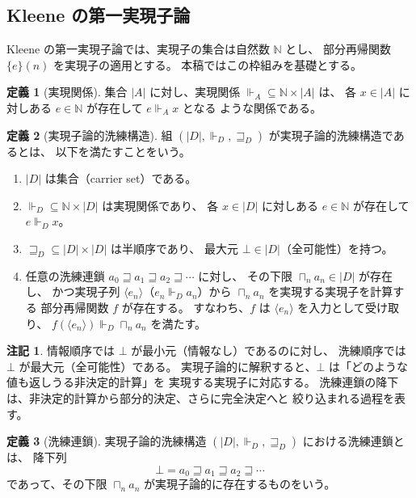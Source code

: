 \documentclass[11pt,a4paper]{article}
\theoremstyle{definition}
\newtheorem{definition}{定義}[section]
\newtheorem{remark}{注記}[section]
\DeclareMathOperator*{\bigsqcap}{\sqcap}
\newcommand{\Real}{\Vdash}
\begin{document}
\subsection{Kleene の第一実現子論}

Kleene の第一実現子論では、実現子の集合は自然数 $\mathbb{N}$ とし、
部分再帰関数 $\{e\}(n)$ を実現子の適用とする。
本稿ではこの枠組みを基礎とする。

\begin{definition}[実現関係]
集合 $|A|$ に対し、実現関係 $\Real_A \subseteq \mathbb{N} \times |A|$ は、
各 $x \in |A|$ に対しある $e \in \mathbb{N}$ が存在して $e \Real_A x$ となる
ような関係である。
\end{definition}

\begin{definition}[実現子論的洗練構造]
組 $(|D|, \Real_D, \sqsupseteq_D)$ が実現子論的洗練構造であるとは、
以下を満たすことをいう。

\begin{enumerate}
\item $|D|$ は集合（carrier set）である。
\item $\Real_D \subseteq \mathbb{N} \times |D|$ は実現関係であり、
  各 $x \in |D|$ に対しある $e \in \mathbb{N}$ が存在して $e \Real_D x$。
\item $\sqsupseteq_D \subseteq |D| \times |D|$ は半順序であり、
  最大元 $\bot \in |D|$（全可能性）を持つ。
\item 任意の洗練連鎖 $a_0 \sqsupseteq a_1 \sqsupseteq a_2 \sqsupseteq \cdots$ に対し、
  その下限 $\bigsqcap_n a_n \in |D|$ が存在し、
  かつ実現子列 $\langle e_n \rangle$（$e_n \Real_D a_n$）から
  $\bigsqcap_n a_n$ を実現する実現子を計算する
  部分再帰関数 $f$ が存在する。
  すなわち、$f$ は $\langle e_n \rangle$ を入力として受け取り、
  $f(\langle e_n \rangle) \Real_D \bigsqcap_n a_n$ を満たす。
\end{enumerate}
\end{definition}

\begin{remark}
情報順序では $\bot$ が最小元（情報なし）であるのに対し、
洗練順序では $\bot$ が最大元（全可能性）である。
実現子論的に解釈すると、$\bot$ は「どのような値も返しうる非決定的計算」を
実現する実現子に対応する。
洗練連鎖の降下は、非決定的計算から部分的決定、さらに完全決定へと
絞り込まれる過程を表す。
\end{remark}

\begin{definition}[洗練連鎖]
実現子論的洗練構造 $(|D|, \Real_D, \sqsupseteq_D)$ における洗練連鎖とは、
降下列
\begin{equation}
\bot = a_0 \sqsupseteq a_1 \sqsupseteq a_2 \sqsupseteq \cdots
\end{equation}
であって、その下限 $\bigsqcap_n a_n$ が実現子論的に存在するものをいう。
\end{definition}
\end{document}
